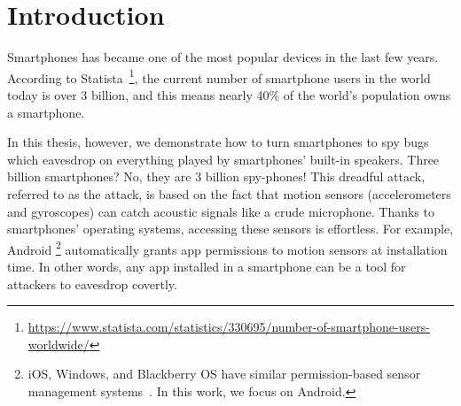 \section{Introduction}\label{sec:intro}

Smartphones has became one of the most popular devices in the last few years. According to Statista~\footnote{\url{https://www.statista.com/statistics/330695/number-of-smartphone-users-worldwide/}}, the current number of smartphone users in the world today is over 3 billion, and this means nearly 40\% of the world’s population owns a smartphone. 

In this thesis, however, we demonstrate how to turn smartphones to spy bugs which eavesdrop on everything played by smartphones' built-in speakers. Three billion smartphones? No, they are 3 billion spy-phones!
%
This dreadful attack, referred to as the \textit{{\attackName}} attack, is based on the fact that motion sensors (accelerometers and gyroscopes) can catch acoustic signals like a crude microphone. 
%
%
Thanks to smartphones' operating systems, accessing these sensors is effortless. 
For example,  Android
\footnote{\scriptsize iOS, Windows, and Blackberry OS have similar permission-based sensor management systems~\cite{sikder20176thsense}. In this work, we focus on Android.} 
automatically grants app permissions to motion sensors at installation time. In other words, any app installed in a smartphone can be a tool for attackers to eavesdrop covertly.

